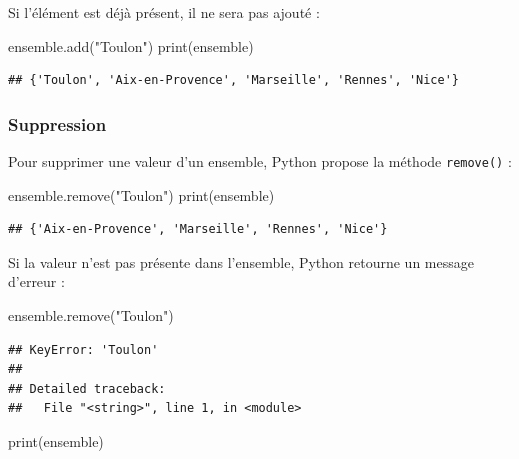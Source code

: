 \documentclass[12pt,]{book}
\newenvironment{Shaded}{\begin{snugshade}}{\end{snugshade}}
\newcommand{\StringTok}[1]{\textcolor[rgb]{0.31,0.60,0.02}{#1}}
\newcommand{\BuiltInTok}[1]{#1}
\newcommand{\NormalTok}[1]{#1}
\numberwithin{equation}{section}
\numberwithin{countremarque}{section}
\begin{document}
Si l'élément est déjà présent, il ne sera pas ajouté :

\begin{Shaded}
\begin{Highlighting}[]
\NormalTok{ensemble.add(}\StringTok{"Toulon"}\NormalTok{)}
\BuiltInTok{print}\NormalTok{(ensemble)}
\end{Highlighting}
\end{Shaded}

\begin{lstlisting}
## {'Toulon', 'Aix-en-Provence', 'Marseille', 'Rennes', 'Nice'}
\end{lstlisting}

\subsubsection{Suppression}\label{suppression}

Pour supprimer une valeur d'un ensemble, Python propose la méthode
\texttt{remove()} :

\begin{Shaded}
\begin{Highlighting}[]
\NormalTok{ensemble.remove(}\StringTok{"Toulon"}\NormalTok{)}
\BuiltInTok{print}\NormalTok{(ensemble)}
\end{Highlighting}
\end{Shaded}

\begin{lstlisting}
## {'Aix-en-Provence', 'Marseille', 'Rennes', 'Nice'}
\end{lstlisting}

Si la valeur n'est pas présente dans l'ensemble, Python retourne un
message d'erreur :

\begin{Shaded}
\begin{Highlighting}[]
\NormalTok{ensemble.remove(}\StringTok{"Toulon"}\NormalTok{)}
\end{Highlighting}
\end{Shaded}

\begin{lstlisting}
## KeyError: 'Toulon'
## 
## Detailed traceback: 
##   File "<string>", line 1, in <module>
\end{lstlisting}

\begin{Shaded}
\begin{Highlighting}[]
\BuiltInTok{print}\NormalTok{(ensemble)}
\end{Highlighting}
\end{Shaded}
\end{document}
